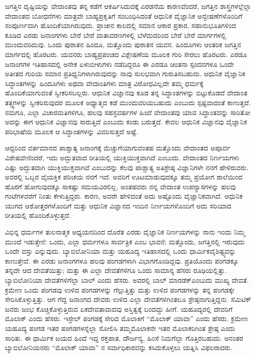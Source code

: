 ಜಗತ್ತಿನ ದೃಷ್ಟಿಯನ್ನು ವೇದಾಂತವು ತನ್ನ ಕಡೆಗೆ ಆಕರ್ಷಿಸಿದುದಕ್ಕೆ ಎರಡನೆಯ ಕಾರಣವೆಂದರೆ, ಜಗತ್ತಿನ ಶಾಸ್ತ್ರಗಳಲ್ಲೆಲ್ಲಾ ವೇದಾಂತದ ಬೋಧನೆಗಳು ಮಾತ್ರವೇ ಬಾಹ್ಯಪ್ರಕೃತಿಗೆ ಸಂಬಂಧಿಸಿದಂತೆ ಆಧುನಿಕ ವೈಜ್ಞಾನಿಕ ಅನ್ವೇಷಣೆಗಳೊಂದಿಗೆ ಸಂಪೂರ್ಣವಾಗಿ ಹೊಂದಿಕೆಯಾಗಿರುವುದು. ಪ್ರಾಚೀನ ಕಾಲದಲ್ಲಿ ಸಮಾನ ಆಕಾರ ಪ್ರಕಾರ, ಸಹಾನುಭೂತಿಗಳಿಂದ ಕೂಡಿದ ಎರಡು ಜನಾಂಗಗಳು ಬೇರೆ ಬೇರೆ ವಾತಾವರಣಗಳಲ್ಲಿ ಬೆಳೆದುದರಿಂದ ಬೇರೆ ಬೇರೆ ಮಾರ್ಗಗಳಲ್ಲಿ ಮುಂದುವರಿದುವು. ಒಂದು ಪುರಾತನ ಹಿಂದೂ, ಮತ್ತೊಂದು ಪುರಾತನ ಯವನ. ಹಿಂದೂಗಳು ಆಂತರಿಕ ಜಗತ್ತಿನ ಮಾರ್ಗದಲ್ಲಿ ಹೊರಟರು. ಯವನರು ಬಾಹ್ಯಪ್ರಪಂಚದ ವಿಶ್ಲೇಷಣೆಯ ಮೂಲಕ ಗುರಿ ಸೇರಲು ಹೊರಟರು. ಎರಡೂ ಜನಾಂಗಗಳ ಇತಿಹಾಸದಲ್ಲಿ ಅನೇಕ ಏಳುಬೀಳುಗಳು ನಡೆದಿದ್ದರೂ ಈ ಎರಡೂ ಚಿಂತನಾ ಸ್ಪಂದನಗಳೂ ಒಂದೇ ಅತೀತದ ಗುರಿಯ ಸಮಾನ ಪ್ರತಿಧ್ವನಿಗಳಾಗಿರುವುದನ್ನು ನಾವು ಸುಲಭವಾಗಿ ಗುರುತಿಸಬಹುದು. ಆಧುನಿಕ ವೈಜ್ಞಾನಿಕ ಸಿದ್ಧಾಂತಗಳನ್ನು ಹಿಂದೂಗಳು ಅಥವಾ ವೇದಾಂತಿಗಳು ಮಾತ್ರ ವಿರೋಧವಿಲ್ಲದೇ ತಮ್ಮ ಧರ್ಮಕ್ಕೆ ಹೊಂದಿಕೆಯಾಗುವಂತೆ ಸ್ವೀಕರಿಸಬಲ್ಲರು. ಆಧುನಿಕ ವಿಜ್ಞಾನವು ಕೂಡ ತನ್ನ ಸಿದ್ಧಾಂತಗಳನ್ನು ಬಿಟ್ಟುಕೊಡದೆ ವೇದಾಂತ ತತ್ತ್ವಗಳನ್ನು ಸ್ವೀಕರಿಸುವುದರ ಮೂಲಕ ಅಧ್ಯಾತ್ಮದ ಕಡೆ ಮುಂದುವರಿಯಬಹುದು ಎಂಬುದು ಸ್ಪಷ್ಟವಾದಂತೆ ಕಾಣುತ್ತದೆ. ನಮಗೂ, ಎಲ್ಲಾ ವಿಚಾರಮತಿಗಳಿಗೂ, ಹಲವು ಸಹಸ್ರವರ್ಷಗಳ ಹಿಂದೆ ವೇದಾಂತವು ಯಾವ ಸಿದ್ಧಾಂತವನ್ನು ಸಾರಿತೋ ಅದನ್ನು ಈಗ ಆಧುನಿಕ ವಿಜ್ಞಾನವು ಸಾರುತ್ತಿದೆ ಎಂಬುದು ಕಂಡು ಬರುತ್ತದೆ. ಕೇವಲ ಆಧುನಿಕ ವಿಜ್ಞಾನವು ವೈಜ್ಞಾನಿಕ ಪರಿಭಾಷೆಯ ಮೂಲಕ ಆ ಸಿದ್ಧಾಂತಗಳನ್ನು ವಿವರಿಸುತ್ತದೆ ಅಷ್ಟೆ.

\vskip 0.2cm

ಆದ್ದರಿಂದ ವರ್ತಮಾನದ ಪಾಶ್ಚಾತ್ಯ ಜನಾಂಗಕ್ಕೆ ಮೆಚ್ಚುಗೆಯಾಗುವಂತಹ ಮತ್ತೊಂದು ವೇದಾಂತದ ಅಪೂರ್ವ ವಿಶೇಷವೇನೆಂದರೆ, ಇದು ಅದ್ಭುತವಾದ ರೀತಿಯಲ್ಲಿ ಯುಕ್ತಿಯುಕ್ತ\-ವಾಗಿದೆ ಎಂಬುದು. ವೇದಾಂತದ ನಿರ್ಣಯಗಳು ಎಷ್ಟು ಅದ್ಭುತವಾಗಿ ಯುಕ್ತಿಯುಕ್ತವಾಗಿವೆ ಎಂಬುದನ್ನು ಕೆಲವು ಪಾಶ್ಚಾತ್ಯ ಅತಿಶ್ರೇಷ್ಠ ವಿಜ್ಞಾನಿಗಳೇ ನನಗೆ ಹೇಳಿರುವರು. ಅವರಲ್ಲಿ ಒಬ್ಬರ ವೈಯಕ್ತಿಕ ಪರಿಚಯ ನನಗೆ ಇದೆ. ಅವರಿಗೆ ಊಟಮಾಡುವುದಕ್ಕೂ ತಮ್ಮ ಪ್ರಯೋಗ ಶಾಲೆಯಿಂದ ಹೊರಗೆ ಹೋಗುವುದಕ್ಕೂ ಸಾಕಷ್ಟು ಸಮಯವಿರಲಿಲ್ಲ. ಅಂತಹವರು ನನ್ನ ವೇದಾಂತ ಉಪನ್ಯಾಸಗಳನ್ನು ಹಲವು ಗಂಟೆಗಳವರೆಗೆ ನಿಂತು ಕೇಳುತ್ತಿದ್ದರು. ಕಾರಣ, ಅವರೇ ಹೇಳಿದಂತೆ ಅದು ಅಷ್ಟೊಂದು ವೈಜ್ಞಾನಿಕವಾಗಿದೆ. ಆಧುನಿಕ ಯುಗದ ಆಶೋತ್ತರಗಳೊಂದಿಗೆ ಮತ್ತು ಆಧುನಿಕ ವಿಜ್ಞಾನದ ಇಂದಿನ ನಿರ್ಣಯಗಳೊಂದಿಗೆ ಅದು ಸರಿಯಾದ ರೀತಿಯಲ್ಲಿ ಹೊಂದಿಕೊಳ್ಳುತ್ತದೆ.

\eject

ವಿಭಿನ್ನ ಧರ್ಮಗಳ ತುಲನಾತ್ಮಕ ಅಧ್ಯಯನದಿಂದ ದೊರೆತ ಎರಡು ವೈಜ್ಞಾನಿಕ ನಿರ್ಣಯಗಳನ್ನು ನಾನು ಇಂದು ನಿಮ್ಮ ಮುಂದೆ ಇಡುತ್ತೇನೆ: ಒಂದು, ಎಲ್ಲಾ ಧರ್ಮಗಳೂ ಸಾರ್ವತ್ರಿಕ ಎಂಬ ಭಾವನೆ; ಮತ್ತೊಂದು, ಜಗತ್ತಿನಲ್ಲಿ ಇರುವುದು ಒಂದೇ ವಸ್ತು ಎನ್ನುವುದು. ಬ್ಯಾಬಿಲೋನಿಯಾ ಮತ್ತು ಯಹೂದ್ಯ ಇತಿಹಾಸದಲ್ಲಿ ಒಂದು ಧಾರ್ಮಿಕ\break ವೈಶಿಷ್ಟ್ಯವನ್ನು ಕಾಣುತ್ತೇವೆ. ಈ ಎರಡು ಜನಾಂಗಗಳೂ ಹಲವು ಪಂಗಡಗಳಾಗಿ ವಿಭಾಗಗೊಂಡಿದ್ದವು. ಪ್ರತಿಯೊಂದು ಪಂಗಡಕ್ಕೂ ತನ್ನದೇ ಆದ ದೇವತೆಯಿತ್ತು; ಮತ್ತು ಈ ಎಲ್ಲಾ ದೇವತೆಗಳಿಗೂ ಒಂದು ಸಾಮಾನ್ಯ ಹೆಸರು ರೂಢಿಯಲ್ಲಿತ್ತು. ಬ್ಯಾಬಿಲೋನಿಯಾ ದೇವತೆಗಳಿಗೆಲ್ಲಾ ಬಾಲ್​ ಎಂದು ಹೆಸರು. ಅವರಲ್ಲಿ ಬಾಲ್​ ಮಾರಡೆಕ್​ ಎಂಬುದು ಮುಖ್ಯ ದೇವತೆ. ಕ್ರಮೇಣ ಒಂದು ಪಂಗಡವು ಉಳಿದ ಪಂಗಡಗಳನ್ನು ಗೆಲ್ಲುತ್ತಿತ್ತು ಮತ್ತು ಉಳಿದ ಪಂಗಡಗಳನ್ನು ತನ್ನ ಪಂಗಡಕ್ಕೇ ಸೇರಿಸಿಕೊಳ್ಳುತ್ತಿತ್ತು. ಆಗ ಗೆದ್ದ ಜನಾಂಗದ ದೇವರು ಉಳಿದ ಎಲ್ಲಾ ದೇವತೆಗಳಿಗಿಂತಲೂ ಶ್ರೇಷ್ಠನಾಗುತ್ತಿದ್ದನು. ಸೆಮಿಟಿಕ್​ ಜನರು ಜಂಭ ಕೊಚ್ಚಿಕೊಳ್ಳುತ್ತಿರುವ ಏಕದೇವತಾವಾದವು ಅಸ್ತಿತ್ವಕ್ಕೆ ಬಂದದ್ದು ಹೀಗೆ. ಯಹೂದ್ಯರಲ್ಲಿ ದೇವರಿಗೆ ಮೊಲಾಕ್​ ಎಂದು ಹೆಸರು. ಇಸ್ರೇಲ್​ ಪಂಗಡಕ್ಕೆ ಸೇರಿದ ಮೊಲಾಕಿಗೆ “ಮೊಲಾಕ್​ ಯಾವಾ” ಎಂದು ಹೆಸರು. ಕ್ರಮೇಣ ಯಹೂದ್ಯ ಪಂಗಡ ಇತರ ಪಂಗಡಗಳನ್ನೆಲ್ಲಾ ಸೋಲಿಸಿ ತಮ್ಮ\break ಮೊಲಾಕನೇ ಇತರ ಮೊಲಾಕರಿಗಿಂತ ಶ್ರೇಷ್ಠ ಎಂದು ಸಾರಿತು. ಈ ಧಾರ್ಮಿಕ ಜಯದ ಹಿಂದೆ ಇದ್ದ ರಕ್ತಪಾತ, ದೌರ್ಜನ್ಯ, ಹಿಂಸೆ ನಿಮಗೆಲ್ಲಾ ಗೊತ್ತಿರಬಹುದು. ಅನಂತರ ಬ್ಯಾಬಿಲೋನಿಯನರು “ಮೊಲಾಕ್​ ಯಾವಾ” ನ ಸರ್ವಾಧಿಕಾರವನ್ನು ಕಸಿದುಕೊಳ್ಳಲು ಯತ್ನಿಸಿ ವಿಫಲರಾದರು.

